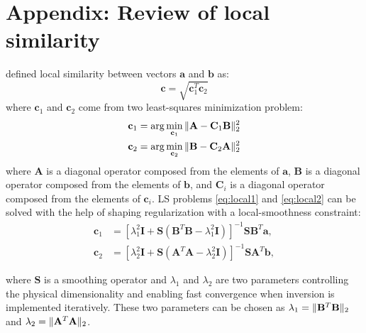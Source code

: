 \section{Appendix: Review of local similarity}
\cite{fomel2007localattr} defined local similarity between vectors $\mathbf{a}$ and $\mathbf{b}$ as:
\begin{equation}
\label{eq:local}
\mathbf{c}=\sqrt{\mathbf{c}_1^T\mathbf{c}_2}
\end{equation}
where $\mathbf{c}_1$ and $\mathbf{c}_2$ come from two least-squares minimization problem:
\begin{align}
\label{eq:local1}
\mathbf{c}_1 &=\arg\min_{\mathbf{c}_1}\Arrowvert \mathbf{A}-\mathbf{C}_1 \mathbf{B} \Arrowvert_2^2 \\
\label{eq:local2}
\mathbf{c}_2 &=\arg\min_{\mathbf{c}_2}\Arrowvert \mathbf{B}-\mathbf{C}_2 \mathbf{A} \Arrowvert_2^2
\end{align}
where $\mathbf{A}$ is a diagonal operator composed from the elements of $\mathbf{a}$, $\mathbf{B}$ is a diagonal operator composed from the elements of $\mathbf{b}$, and $\mathbf{C}_i$ is a diagonal operator composed from the elements of $\mathbf{c}_i$.
LS problems \ref{eq:local1} and \ref{eq:local2} can be solved with the help of shaping regularization with a local-smoothness constraint:
\begin{align}
\label{eq:local3}
\mathbf{c}_1 &= [\lambda_1^2\mathbf{I} + \mathbf{S}(\mathbf{B}^T\mathbf{B}-\lambda_1^2\mathbf{I})]^{-1}\mathbf{SB}^T\mathbf{a},\\
\label{eq:local4}
\mathbf{c}_2 &= [\lambda_2^2\mathbf{I} + \mathbf{S}(\mathbf{A}^T\mathbf{A}-\lambda_2^2\mathbf{I})]^{-1}\mathbf{SA}^T\mathbf{b},
\end{align}

where $\mathbf{S}$ is a smoothing operator and $\lambda_1$ and $\lambda_2$ are two parameters controlling the physical dimensionality and enabling fast convergence when inversion is implemented iteratively. These two parameters can be chosen as $\lambda_1  = \Arrowvert\mathbf{B}^T\mathbf{B}\Arrowvert_2$ and $\lambda_2  = \Arrowvert\mathbf{A}^T\mathbf{A}\Arrowvert_2$.

